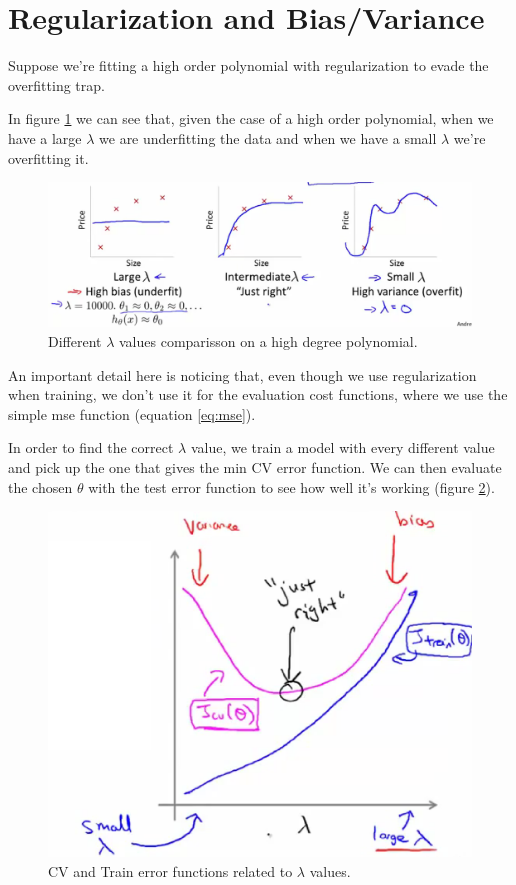 \documentclass[10pt]{extarticle}
\begin{document}
\section{Regularization and
Bias/Variance}\label{regularization-and-biasvariance}

Suppose we're fitting a high order polynomial with regularization to
evade the overfitting trap.

In figure \ref{fig:lambda_bias_variance} we can see that, given the case
of a high order polynomial, when we have a large $\lambda$ we are
underfitting the data and when we have a small $\lambda$ we're
overfitting it.

\begin{figure}
\centering
\includegraphics[width=\textwidth]{img/lambda_bias_variance.eps}
\caption{Different $\lambda$ values comparisson on a high degree polynomial.}
\label{fig:lambda_bias_variance}
\end{figure}

An important detail here is noticing that, even though we use
regularization when training, we don't use it for the evaluation cost
functions, where we use the simple mse function (equation \ref{eq:mse}).

In order to find the correct $\lambda$ value, we train a model with
every different value and pick up the one that gives the min CV error
function. We can then evaluate the chosen $\theta$ with the test error
function to see how well it's working (figure
\ref{fig:lambda_cv_train_error}).

\begin{figure}
\centering
\includegraphics[width=\textwidth]{img/lambda_cv_train_error.eps}
\caption{CV and Train error functions related to $\lambda$ values.}
\label{fig:lambda_cv_train_error}
\end{figure}
\end{document}
